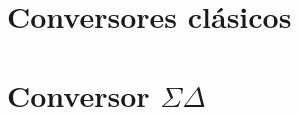 







\tableofcontents
\newpage


\section{Conversores clásicos}
	\label{ADA}
	
	
\section{Conversor $\Sigma \Delta$}
	\label{Ejercicio-2}
	
	
